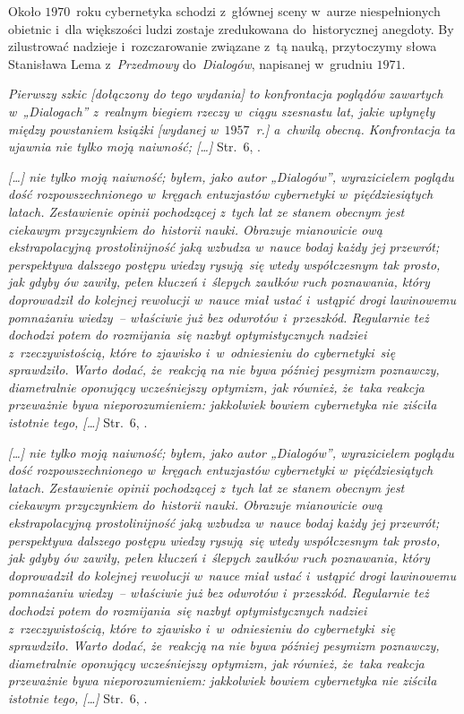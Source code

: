 \documentclass[10pt,t]{beamer}
\begin{document}
\begin{frame}
  Około $1970$~roku cybernetyka schodzi z~głównej sceny w~aurze
  niespełnionych obietnic i~dla większości ludzi zostaje zredukowana
  do~historycznej anegdoty. By zilustrować nadzieje i~rozczarowanie związane
  z~tą nauką, przytoczymy słowa Stanisława Lema z~\textit{Przedmowy}
  do~\textit{Dialogów}, napisanej w~grudniu $1971$.

  \textit{Pierwszy szkic [dołączony do tego wydania] to konfrontacja
    poglądów zawartych w~„Dialogach” z~realnym biegiem rzeczy w~ciągu
    szesnastu lat, jakie upłynęły między powstaniem książki [wydanej
    w~$1957$~r.] a~chwilą obecną. Konfrontacja ta ujawnia nie
    tylko moją naiwność; [\ldots]}
  Str.~$6$, \parencite{Lem-Dialogi-Vol-I-Pub-1996}.

      \textit{[\ldots] nie tylko moją naiwność; byłem, jako autor „Dialogów”,
    wyrazicielem poglądu dość
    rozpowszechnionego w~kręgach entuzjastów cybernetyki w~pięćdziesiątych
    latach. Zestawienie opinii pochodzącej z~tych lat ze stanem obecnym jest
    ciekawym przyczynkiem do~historii nauki. Obrazuje mianowicie ową
    ekstrapolacyjną prostolinijność jaką wzbudza w~nauce bodaj każdy jej
    przewrót; perspektywa dalszego postępu wiedzy rysują~się wtedy
    współczesnym tak prosto, jak gdyby ów zawiły, pełen kluczeń i~ślepych
    zaułków ruch poznawania, który doprowadził do kolejnej rewolucji
    w~nauce miał ustać i~ustąpić drogi lawinowemu pomnażaniu wiedzy~--
    właściwie już bez odwrotów i~przeszkód. Regularnie też dochodzi potem
    do rozmijania~się nazbyt optymistycznych nadziei z~rzeczywistością,
    które to zjawisko i~w~odniesieniu do cybernetyki~się sprawdziło. Warto
    dodać, że~reakcją na nie bywa później pesymizm poznawczy, diametralnie
    oponujący wcześniejszy optymizm, jak również, że~taka reakcja przeważnie
    bywa nieporozumieniem: jakkolwiek bowiem cybernetyka nie ziściła
    istotnie tego, [\ldots]}
  Str.~$6$, \parencite{Lem-Dialogi-Vol-I-Pub-1996}.


  \textit{[\ldots] nie tylko moją naiwność; byłem, jako autor „Dialogów”,
    wyrazicielem poglądu dość
    rozpowszechnionego w~kręgach entuzjastów cybernetyki w~pięćdziesiątych
    latach. Zestawienie opinii pochodzącej z~tych lat ze stanem obecnym jest
    ciekawym przyczynkiem do~historii nauki. Obrazuje mianowicie ową
    ekstrapolacyjną prostolinijność jaką wzbudza w~nauce bodaj każdy jej
    przewrót; perspektywa dalszego postępu wiedzy rysują~się wtedy
    współczesnym tak prosto, jak gdyby ów zawiły, pełen kluczeń i~ślepych
    zaułków ruch poznawania, który doprowadził do kolejnej rewolucji
    w~nauce miał ustać i~ustąpić drogi lawinowemu pomnażaniu wiedzy~--
    właściwie już bez odwrotów i~przeszkód. Regularnie też dochodzi potem
    do rozmijania~się nazbyt optymistycznych nadziei z~rzeczywistością,
    które to zjawisko i~w~odniesieniu do cybernetyki~się sprawdziło. Warto
    dodać, że~reakcją na nie bywa później pesymizm poznawczy, diametralnie
    oponujący wcześniejszy optymizm, jak również, że~taka reakcja przeważnie
    bywa nieporozumieniem: jakkolwiek bowiem cybernetyka nie ziściła
    istotnie tego, [\ldots]}
  Str.~$6$, \parencite{Lem-Dialogi-Vol-I-Pub-1996}.

\end{frame}
\end{document}
